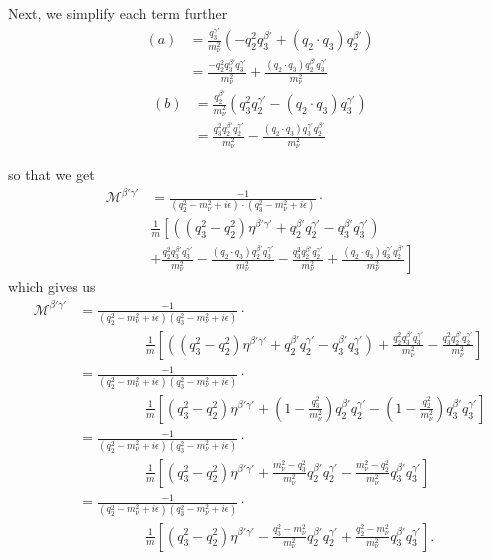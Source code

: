 \documentclass[12pt]{article}
\numberwithin{figure}{section}
\numberwithin{table}{section}
\newcommand{\eps}{\epsilon}
\newcommand{\paren}[1]{\left(#1\right)}
\newcommand{\bracket}[1]{\left[#1\right]}
\newcommand{\p}[1]{\left(#1\right)}
\begin{document}
Next, we simplify each term further
\begin{align*}
    (a)&=  \frac{ q_3^{\gamma'}}{m_\nu^2}  \paren{-q_2^2q_3^{\beta'}+ (q_2\cdot q_3)q_2^{\beta'}}\\
    &= \frac{-q_2^2q_3^{\beta'}q_3^{\gamma'}}{m_\nu^2} + \frac{(q_2\cdot q_3)q_2^{\beta'}q_3^{\gamma'}}{m_\nu^2}
\end{align*}
\begin{align*}
    (b) &=  \frac{q_2^{\beta'}}{m_\nu^2}   \paren{q_3^2q_2^{\gamma'} - (q_2\cdot q_3)q_3^{\gamma'}}\\
    &= \frac{q_3^2q_2^{\beta'}q_2^{\gamma'}}{m_\nu^2} - \frac{(q_2\cdot q_3)q_3^{\gamma'}q_2^{\beta'}}{m_\nu^2}
\end{align*}

so that we get
\begin{align*}
 \mathcal{M}^{\beta'\gamma'}&= \frac{-1}{\p{q_2^2-m_\nu^2+i\eps}\cdot \paren{q_3^2-m_\nu^2+i\eps}} \cdot
 \\ &\frac{1}{m} \left[  \paren{\paren{q_3^2-q_2^2}\eta^{\beta'\gamma'} +q_2^{\beta'}q_2^{\gamma'}-q_3^{\beta'}q_3^{\gamma'} }\right.
    \\ &+ \left.  \frac{q_2^2q_3^{\beta'}q_3^{\gamma'}}{m_\nu^2} - \frac{(q_2\cdot q_3)q_2^{\beta'}q_3^{\gamma'}}{m_\nu^2}-\frac{q_3^2q_2^{\beta'}q_2^{\gamma'}}{m_\nu^2} + \frac{(q_2\cdot q_3)q_3^{\gamma'}q_2^{\beta'}}{m_\nu^2}  \right]
\end{align*}
which gives us
\begin{align*}
      \mathcal{M}^{\beta'\gamma'}&= \frac{-1}{\p{q_2^2-m_\nu^2+i\eps} \paren{q_3^2-m_\nu^2+i\eps}} \cdot
 \\ &\hspace{2cm}\frac{1}{m} \left[  \paren{\paren{q_3^2-q_2^2}\eta^{\beta'\gamma'} +q_2^{\beta'}q_2^{\gamma'}-q_3^{\beta'}q_3^{\gamma'} }
    +  \frac{q_2^2q_3^{\beta'}q_3^{\gamma'}}{m_\nu^2}
    -  \frac{q_3^2q_2^{\beta'}q_2^{\gamma'}}{m_\nu^2}\right]\\
   &= \frac{-1}{\p{q_2^2-m_\nu^2+i\eps} \paren{q_3^2-m_\nu^2+i\eps}} \cdot
 \\  & \hspace{2cm}\frac{1}{m} \left[ \paren{q_3^2-q_2^2}\eta^{\beta'\gamma'} + \paren{1-\frac{q_3^2}{m_\nu^2}}q_2^{\beta'}q_2^{\gamma'}  - \paren{1-\frac{q_2^2}{m_\nu^2}}q_3^{\beta'}q_3^{\gamma'}
   \right]  \\
   &= \frac{-1}{\p{q_2^2-m_\nu^2+i\eps} \paren{q_3^2-m_\nu^2+i\eps}} \cdot \\
   & \hspace{2cm}\frac{1}{m}\bracket{ \paren{q_3^2-q_2^2}\eta^{\beta'\gamma'}    + \frac{m_\nu^2-q_3^2}{m_\nu^2}  q_2^{\beta'}q_2^{\gamma'} - \frac{m_\nu^2 - q_2^2}{m_\nu^2}q_3^{\beta'}q_3^{\gamma'}} \\
   &=\frac{-1}{\p{q_2^2-m_\nu^2+i\eps} \paren{q_3^2-m_\nu^2+i\eps}} \cdot \\
   & \hspace{2cm}\frac{1}{m}\bracket{ \paren{q_3^2-q_2^2}\eta^{\beta'\gamma'}    - \frac{q_3^2-m_\nu^2}{m_\nu^2}  q_2^{\beta'}q_2^{\gamma'} + \frac{q_2^2 - m_\nu^2}{m_\nu^2}q_3^{\beta'}q_3^{\gamma'}} .
\end{align*}
\end{document}
